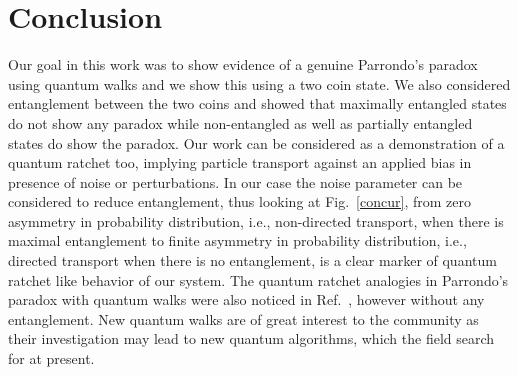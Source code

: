 \documentclass[english,aps,pra,amsmath,amssymb,showpacs,notitlepage,onecolumn]{revtex4-1}
\begin{document}
\section{Conclusion}
Our goal in this work was to show evidence of a genuine Parrondo's paradox using quantum walks and we show this using a two coin state. We also considered entanglement between the two coins and showed that maximally entangled states do not show any paradox while non-entangled as well as partially entangled states do show the paradox. Our work can be considered as a demonstration of a  quantum ratchet too, implying particle transport against an applied bias in presence of noise or perturbations. In our case the noise parameter can be considered to reduce entanglement, thus looking at Fig.~\ref{concur}, from zero asymmetry in probability distribution, i.e., non-directed transport, when there is maximal entanglement to finite asymmetry in probability distribution, i.e., directed transport when there is no entanglement, is a clear marker of quantum ratchet like behavior of our system. The quantum ratchet analogies in Parrondo's paradox with quantum walks were also noticed in Ref.~\cite{Meyer}, however without any entanglement. New quantum walks are of great interest to the community as their investigation may lead to new quantum algorithms, which the field search for at present.
\end{document}
